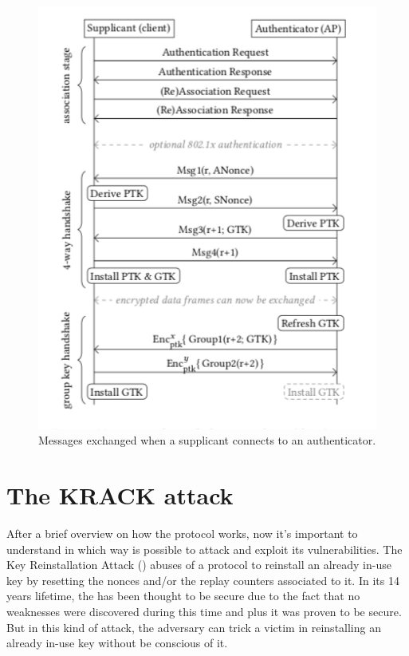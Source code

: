\begin{description}
\begin{figure}[tbh]
  \centering
  \includegraphics[width=0.8\linewidth]{images/mess-ex.png}
  \caption[Message exchange in \fwh]{Messages exchanged when a supplicant connects to an authenticator.}
  \label{fig:mess-ex}
\end{figure}



\end{description}

\section{The KRACK attack}

After a brief overview on how the \fwh protocol works, now it's important to understand in which way is possible to attack and exploit its vulnerabilities.
The Key Reinstallation Attack (\krack) abuses of a protocol to reinstall an already in-use key 
by resetting the nonces and/or the replay counters associated to it. In its 14 years lifetime, the \fwh has been thought to be secure due to the fact that no weaknesses were discovered during this time and plus it was proven to be secure.
But in this kind of attack, the adversary can trick a victim in reinstalling an already in-use key without be conscious of it.

